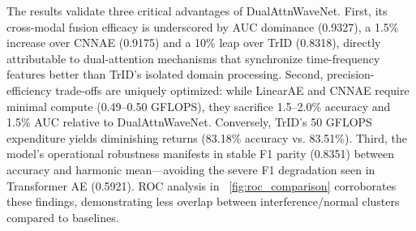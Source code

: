 \documentclass[conference]{IEEEtran}
\begin{document}
\begin{table}[t]
    \caption{Performance Comparison of DualAttnWaveNet Against Baseline Models}
    \label{tab:main_results}
    \centering
\end{table}

The results validate three critical advantages of DualAttnWaveNet. First, its cross-modal fusion efficacy is underscored by AUC dominance (0.9327), a 1.5\% increase over CNNAE (0.9175) and a 10\% leap over TrID (0.8318), directly attributable to dual-attention mechanisms that synchronize time-frequency features better than TrID’s isolated domain processing. Second, precision-efficiency trade-offs are uniquely optimized: while LinearAE and CNNAE require minimal compute (0.49–0.50 GFLOPS), they sacrifice 1.5–2.0\% accuracy and 1.5\% AUC relative to DualAttnWaveNet. Conversely, TrID’s 50 GFLOPS expenditure yields diminishing returns (83.18\% accuracy vs. 83.51\%). Third, the model’s operational robustness manifests in stable F1 parity (0.8351) between accuracy and harmonic mean—avoiding the severe F1 degradation seen in Transformer AE (0.5921). ROC analysis in \figurename~\ref{fig:roc_comparison} corroborates these findings, demonstrating less overlap between interference/normal clusters compared to baselines. 
\end{document}
